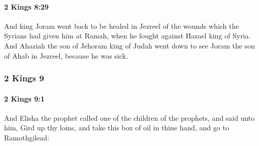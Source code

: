 		\paragraph{2 Kings 8:29} %
			\label{2KINGS-8-29}

			And king Joram went back to be healed in Jezreel of the wounds which the Syrians had given him at Ramah, when he fought against Hazael king of Syria. And Ahaziah the son of Jehoram king of Judah went down to see Joram the son of Ahab in Jezreel, because he was sick.

	\subsubsection{2 Kings 9} %
		\label{2KINGS-9}

		\paragraph{2 Kings 9:1} %
			\label{2KINGS-9-1}

			And Elisha the prophet called one of the children of the prophets, and said unto him, Gird up thy loins, and take this box of oil in thine hand, and go to Ramothgilead:

